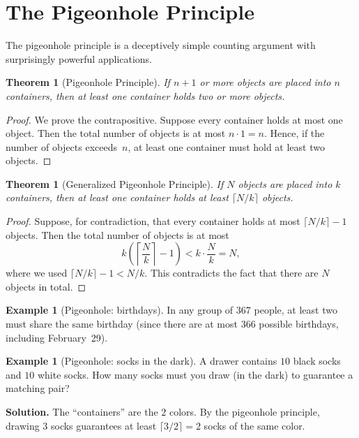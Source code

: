 \documentclass[12pt,a4paper,openany]{book}
\theoremstyle{definition}
\newtheorem{example}[definition]{Example}
\theoremstyle{plain}
\newtheorem{theorem}[definition]{Theorem}
\theoremstyle{remark}
\begin{document}
\section{The Pigeonhole Principle}
\label{sec:pigeonhole}

The pigeonhole principle is a deceptively simple counting argument with surprisingly
powerful applications.

\begin{theorem}[Pigeonhole Principle]
\label{thm:pigeonhole}
If $n + 1$ or more objects are placed into $n$ containers, then at least one container
holds two or more objects.
\end{theorem}

\begin{proof}
We prove the contrapositive. Suppose every container holds at most one object.
Then the total number of objects is at most $n \cdot 1 = n$. Hence, if the number
of objects exceeds~$n$, at least one container must hold at least two objects.
\end{proof}

\begin{theorem}[Generalized Pigeonhole Principle]
\label{thm:pigeonhole-generalized}
If $N$ objects are placed into $k$ containers, then at least one container holds
at least $\lceil N/k \rceil$ objects.
\end{theorem}

\begin{proof}
Suppose, for contradiction, that every container holds at most
$\lceil N/k \rceil - 1$ objects. Then the total number of objects is at most
\[
  k \left(\left\lceil \frac{N}{k} \right\rceil - 1\right)
  < k \cdot \frac{N}{k}
  = N,
\]
where we used $\lceil N/k \rceil - 1 < N/k$. This contradicts the fact that there
are $N$ objects in total.
\end{proof}

\begin{example}[Pigeonhole: birthdays]
\label{ex:pigeonhole-birthdays}
In any group of $367$ people, at least two must share the same birthday
(since there are at most $366$ possible birthdays, including February~29).
\end{example}

\begin{example}[Pigeonhole: socks in the dark]
\label{ex:pigeonhole-socks}
A drawer contains $10$ black socks and $10$ white socks. How many socks must you
draw (in the dark) to guarantee a matching pair?

\textbf{Solution.} The ``containers'' are the $2$ colors. By the pigeonhole principle,
drawing $3$ socks guarantees at least $\lceil 3/2 \rceil = 2$ socks of the same color.
\end{example}
\end{document}
